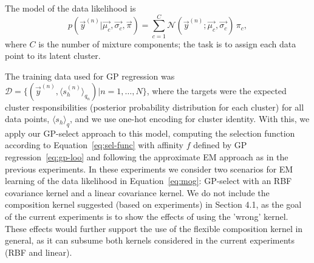 The model of the data likelihood is
%
\vspace{-.2cm}
\begin{equation}\label{eq:mog}
p(\vec{y}^{(n)} | \vec{\mu_c}, \vec{\sigma_c}, \vec{\pi}) = \sum_{c=1}^{C} \mathcal{N}(\vec{y}^{(n)}; \vec{\mu_c}, \vec{\sigma_c}) \, \pi_c,
\end{equation}
%
where $C$ is the number of mixture components; the task is to assign each data point to its latent cluster.
%

The training data used for GP regression was $\mathcal{D} = \{ (\vec{y}^{(n)}, \langle s_h^{(n)}\rangle_{q_n}) | n = 1, \dots, N \}$, where the targets were the expected cluster responsibilities (posterior probability distribution for each cluster) for all data points, $\langle s_h\rangle_{q}$, and we use one-hot encoding for cluster identity.
With this, we apply our GP-select approach to this model, computing the selection function according to Equation~\eqref{eq:sel-func} with affinity $f$ defined by GP regression~\eqref{eq:gp-loo} 
and following the approximate EM approach as in the previous experiments.
%
In these experiments we consider two scenarios for EM learning of the data likelihood in Equation~\eqref{eq:mog}: GP-select with an RBF covariance kernel and a linear covariance kernel.  
We do not include the composition kernel suggested (based on experiments) in Section 4.1, as the goal of the current experiments is to show the  effects of using the 'wrong' kernel. These effects would further support the use of the flexible composition kernel in general, as it can subsume both kernels considered in the current experiments (RBF and linear).
%

